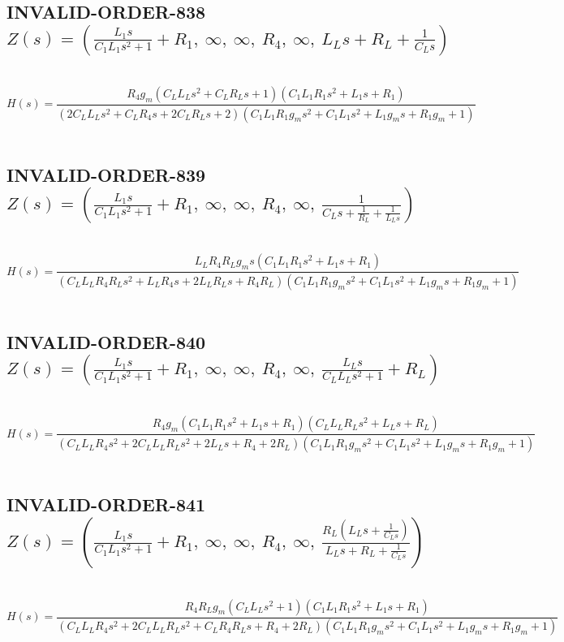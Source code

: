 \documentclass{article}
\begin{document}
\subsection{INVALID-ORDER-838 $Z(s) = \left( \frac{L_{1} s}{C_{1} L_{1} s^{2} + 1} + R_{1}, \  \infty, \  \infty, \  R_{4}, \  \infty, \  L_{L} s + R_{L} + \frac{1}{C_{L} s}\right)$ } \ 
\textbf{\[H(s) = \frac{R_{4} g_{m} \left(C_{L} L_{L} s^{2} + C_{L} R_{L} s + 1\right) \left(C_{1} L_{1} R_{1} s^{2} + L_{1} s + R_{1}\right)}{\left(2 C_{L} L_{L} s^{2} + C_{L} R_{4} s + 2 C_{L} R_{L} s + 2\right) \left(C_{1} L_{1} R_{1} g_{m} s^{2} + C_{1} L_{1} s^{2} + L_{1} g_{m} s + R_{1} g_{m} + 1\right)}\] } \ 
\subsection{INVALID-ORDER-839 $Z(s) = \left( \frac{L_{1} s}{C_{1} L_{1} s^{2} + 1} + R_{1}, \  \infty, \  \infty, \  R_{4}, \  \infty, \  \frac{1}{C_{L} s + \frac{1}{R_{L}} + \frac{1}{L_{L} s}}\right)$ } \ 
\textbf{\[H(s) = \frac{L_{L} R_{4} R_{L} g_{m} s \left(C_{1} L_{1} R_{1} s^{2} + L_{1} s + R_{1}\right)}{\left(C_{L} L_{L} R_{4} R_{L} s^{2} + L_{L} R_{4} s + 2 L_{L} R_{L} s + R_{4} R_{L}\right) \left(C_{1} L_{1} R_{1} g_{m} s^{2} + C_{1} L_{1} s^{2} + L_{1} g_{m} s + R_{1} g_{m} + 1\right)}\] } \ 
\subsection{INVALID-ORDER-840 $Z(s) = \left( \frac{L_{1} s}{C_{1} L_{1} s^{2} + 1} + R_{1}, \  \infty, \  \infty, \  R_{4}, \  \infty, \  \frac{L_{L} s}{C_{L} L_{L} s^{2} + 1} + R_{L}\right)$ } \ 
\textbf{\[H(s) = \frac{R_{4} g_{m} \left(C_{1} L_{1} R_{1} s^{2} + L_{1} s + R_{1}\right) \left(C_{L} L_{L} R_{L} s^{2} + L_{L} s + R_{L}\right)}{\left(C_{L} L_{L} R_{4} s^{2} + 2 C_{L} L_{L} R_{L} s^{2} + 2 L_{L} s + R_{4} + 2 R_{L}\right) \left(C_{1} L_{1} R_{1} g_{m} s^{2} + C_{1} L_{1} s^{2} + L_{1} g_{m} s + R_{1} g_{m} + 1\right)}\] } \ 
\subsection{INVALID-ORDER-841 $Z(s) = \left( \frac{L_{1} s}{C_{1} L_{1} s^{2} + 1} + R_{1}, \  \infty, \  \infty, \  R_{4}, \  \infty, \  \frac{R_{L} \left(L_{L} s + \frac{1}{C_{L} s}\right)}{L_{L} s + R_{L} + \frac{1}{C_{L} s}}\right)$ } \ 
\textbf{\[H(s) = \frac{R_{4} R_{L} g_{m} \left(C_{L} L_{L} s^{2} + 1\right) \left(C_{1} L_{1} R_{1} s^{2} + L_{1} s + R_{1}\right)}{\left(C_{L} L_{L} R_{4} s^{2} + 2 C_{L} L_{L} R_{L} s^{2} + C_{L} R_{4} R_{L} s + R_{4} + 2 R_{L}\right) \left(C_{1} L_{1} R_{1} g_{m} s^{2} + C_{1} L_{1} s^{2} + L_{1} g_{m} s + R_{1} g_{m} + 1\right)}\] } \ 
\end{document}
